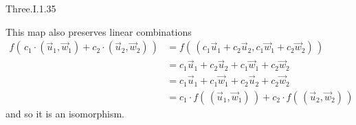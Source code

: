 \begin{ans}{Three.I.1.35}
\begin{exparts}
          This map also preserves linear combinations
          \begin{align*}
            f(\,c_1\cdot(\vec{u}_1,\vec{w}_1)+c_2\cdot (\vec{u}_2,\vec{w}_2)\,)
            &=f(\,(c_1\vec{u}_1+c_2\vec{u}_2,c_1\vec{w}_1+c_2\vec{w}_2)\,) \\
            &=c_1\vec{u}_1+c_2\vec{u}_2+c_1\vec{w}_1+c_2\vec{w}_2    \\
            &=c_1\vec{u}_1+c_1\vec{w}_1+c_2\vec{u}_2+c_2\vec{w}_2    \\
            &=c_1\cdot f(\,(\vec{u}_1,\vec{w}_1)\,)
               +c_2\cdot f(\,(\vec{u}_2,\vec{w}_2)\,)
          \end{align*}
          and so it is an isomorphism.
      \end{exparts}
    
\end{ans}
